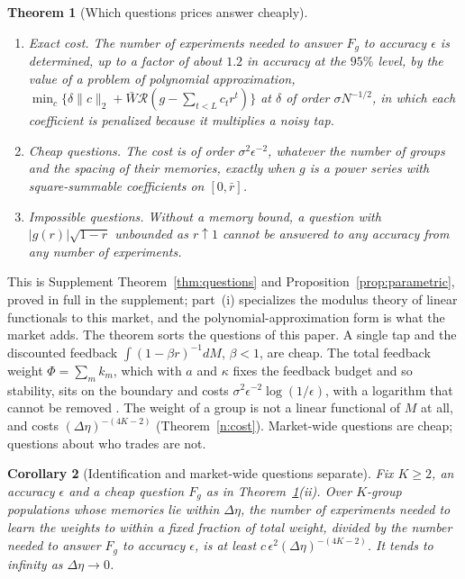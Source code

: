 \documentclass[12pt]{article}
\newtheorem{theorem}{Theorem}[section]
\newtheorem{corollary}[theorem]{Corollary}
\theoremstyle{definition}
\theoremstyle{remark}
\begin{document}
\begin{theorem}[Which questions prices answer cheaply]\label{n:questions}
\begin{enumerate}[label=(\roman*),itemsep=1pt]
\item \emph{Exact cost.} The number of experiments needed to answer $F_g$ to accuracy $\epsilon$ is determined, up to a factor of about $1.2$ in accuracy at the $95\%$ level, by the value of a problem of polynomial approximation, $\min_c\{\delta\|c\|_2+\bar W\mathcal R(g-\sum_{t<L}c_tr^t)\}$ at $\delta$ of order $\sigma N^{-1/2}$, in which each coefficient is penalized because it multiplies a noisy tap.
\item \emph{Cheap questions.} The cost is of order $\sigma^2\epsilon^{-2}$, whatever the number of groups and the spacing of their memories, exactly when $g$ is a power series with square-summable coefficients on $[0,\bar r]$.
\item \emph{Impossible questions.} Without a memory bound, a question with $|g(r)|\sqrt{1-r}$ unbounded as $r\uparrow1$ cannot be answered to any accuracy from any number of experiments.
\end{enumerate}
\end{theorem}

This is Supplement Theorem~\ref{thm:questions} and Proposition~\ref{prop:parametric}, proved in full in the supplement; part~(i) specializes the modulus theory of linear functionals \citep{donoho1994} to this market, and the polynomial-approximation form is what the market adds. The theorem sorts the questions of this paper. A single tap and the discounted feedback $\int(1-\beta r)^{-1}dM$, $\beta<1$, are cheap. The total feedback weight $\Phi=\sum_mk_m$, which with $a$ and $\kappa$ fixes the feedback budget and so stability, sits on the boundary and costs $\sigma^2\epsilon^{-2}\log(1/\epsilon)$, with a logarithm that cannot be removed \citep{niroula2026b}. The weight of a group is not a linear functional of $M$ at all, and costs $(\Delta\eta)^{-(4K-2)}$ (Theorem~\ref{n:cost}). Market-wide questions are cheap; questions about who trades are not.

\begin{corollary}[Identification and market-wide questions separate]\label{n:sep}
Fix $K\ge2$, an accuracy $\epsilon$ and a cheap question $F_g$ as in Theorem~\ref{n:questions}(ii). Over $K$-group populations whose memories lie within $\Delta\eta$, the number of experiments needed to learn the weights to within a fixed fraction of total weight, divided by the number needed to answer $F_g$ to accuracy $\epsilon$, is at least $c\,\epsilon^2(\Delta\eta)^{-(4K-2)}$. It tends to infinity as $\Delta\eta\to0$.
\end{corollary}
\end{document}
